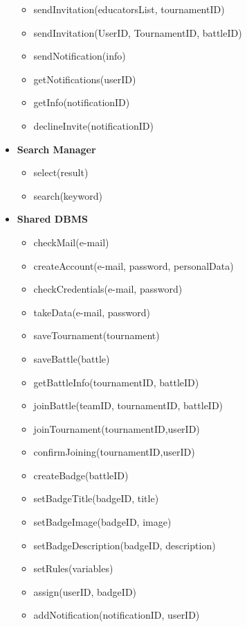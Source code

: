 \documentclass{article}
\begin{document}
\begin{itemize}
\begin{itemize}
            \item sendInvitation(educatorsList, tournamentID)
            \item sendInvitation(UserID, TournamentID, battleID)
            \item sendNotification(info)
            \item getNotifications(userID)
            \item getInfo(notificationID)
            \item declineInvite(notificationID)
        \end{itemize}
    \item \textbf{Search Manager}
        \begin{itemize}
            \item select(result)
            \item search(keyword)
        \end{itemize}
    \item \textbf{Shared DBMS}
        \begin{itemize}
            \item checkMail(e-mail)
            \item createAccount(e-mail, password, personalData)
            \item checkCredentials(e-mail, password)  
            \item takeData(e-mail, password)
            \item saveTournament(tournament)
            \item saveBattle(battle)
            \item getBattleInfo(tournamentID, battleID)
            \item joinBattle(teamID, tournamentID, battleID)
            \item joinTournament(tournamentID,userID)
            \item confirmJoining(tournamentID,userID)
            \item createBadge(battleID)
            \item setBadgeTitle(badgeID, title)
            \item setBadgeImage(badgeID, image)
            \item setBadgeDescription(badgeID, description)
            \item setRules(variables)
            \item assign(userID, badgeID)
            \item addNotification(notificationID, userID)

\end{itemize}
\end{itemize}
\end{document}
